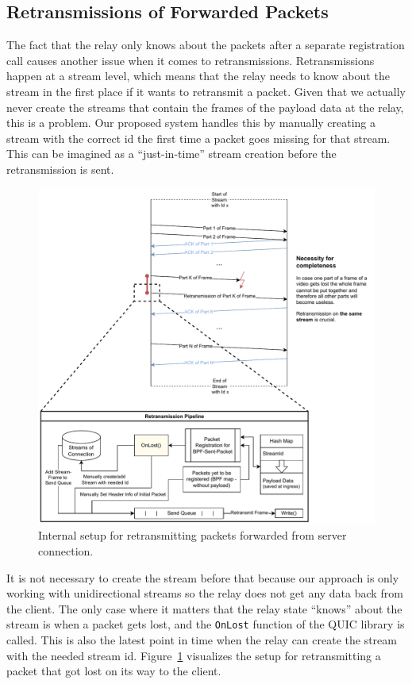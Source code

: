 \subsection{Retransmissions of Forwarded Packets}
The fact that the relay only knows about the packets after a separate registration call causes 
another issue when it comes to retransmissions.
Retransmissions happen at a stream level, which means that the relay needs to know about the 
stream in the first place if it wants to retransmit a packet.
Given that we actually never create the streams that contain the frames of the payload data 
at the relay, this is a problem.
Our proposed system handles this by manually creating a stream with the correct id the first
time a packet goes missing for that stream.
This can be imagined as a ``just-in-time'' stream creation before the retransmission is sent.

\begin{figure}[H]
    \centering
    \includegraphics[width=\textwidth]{figures/03_fast_relays/retransmission.drawio.pdf}
    \caption[Packet retransmission schematic]{Internal setup for retransmitting packets forwarded from server connection.}\label{fig:packet-retransmission}
\end{figure}

\noindent
It is not necessary to create the stream before that because our approach is only working with 
unidirectional streams so the relay does not get any data back from the client.
The only case where it matters that the relay state ``knows'' about the stream is when a packet
gets lost, and the \verb|OnLost| function of the QUIC library is called.
This is also the latest point in time when the relay can create the stream with the needed stream id.
Figure~\ref{fig:packet-retransmission} visualizes the setup for retransmitting a packet that 
got lost on its way to the client. 